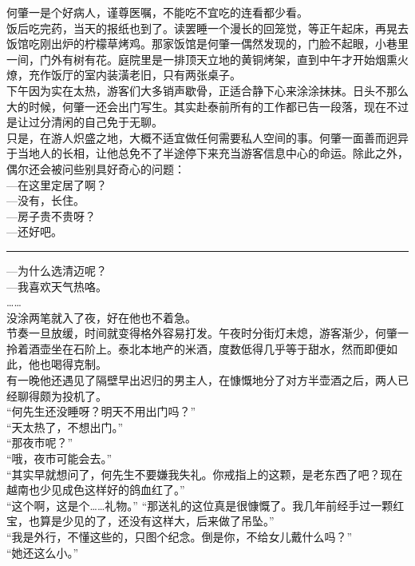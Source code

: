 \documentclass[oneside,11pt]{memoir} %
\begin{document}
\begin{CJK}{UTF8}{gbsn}
    何肇一是个好病人，谨尊医嘱，不能吃不宜吃的连看都少看。\\\indent
    饭后吃完药，当天的报纸也到了。读罢睡一个漫长的回笼觉，等正午起床，再晃去饭馆吃刚出炉的柠檬草烤鸡。那家饭馆是何肇一偶然发现的，门脸不起眼，小巷里一间，门外有树有花。庭院里是一排顶天立地的黄铜烤架，直到中午才开始烟熏火燎，充作饭厅的室内装潢老旧，只有两张桌子。\\\indent
    下午因为实在太热，游客们大多销声歇骨，正适合静下心来涂涂抹抹。日头不那么大的时候，何肇一还会出门写生。其实赴泰前所有的工作都已告一段落，现在不过是让过分清闲的自己免于无聊。\\\indent
    只是，在游人炽盛之地，大概不适宜做任何需要私人空间的事。何肇一面善而迥异于当地人的长相，让他总免不了半途停下来充当游客信息中心的命运。除此之外，偶尔还会被问些别具好奇心的问题：\\\indent
    —在这里定居了啊？\\\indent
    —没有，长住。\\\indent
    —房子贵不贵呀？\\\indent
    —还好吧。\\\indent 
    \rule{-3pt}{30pt} 
    —为什么选清迈呢？\\\indent
    —我喜欢天气热咯。\\\indent
    ……\\\indent
    没涂两笔就入了夜，好在他也不着急。\\\indent
    节奏一旦放缓，时间就变得格外容易打发。午夜时分街灯未熄，游客渐少，何肇一拎着酒壶坐在石阶上。泰北本地产的米酒，度数低得几乎等于甜水，然而即便如此，他也喝得克制。\\\indent
    有一晚他还遇见了隔壁早出迟归的男主人，在慷慨地分了对方半壶酒之后，两人已经聊得颇为投机了。\\\indent
    “何先生还没睡呀？明天不用出门吗？”\\\indent
    “天太热了，不想出门。”\\\indent
    “那夜市呢？”\\\indent
    “哦，夜市可能会去。”\\\indent
    “其实早就想问了，何先生不要嫌我失礼。你戒指上的这颗，是老东西了吧？现在越南也少见成色这样好的鸽血红了。”\\\indent
    “这个啊，这是个……礼物。”
    “那送礼的这位真是很慷慨了。我几年前经手过一颗红宝，也算是少见的了，还没有这样大，后来做了吊坠。”\\\indent
    “我是外行，不懂这些的，只图个纪念。倒是你，不给女儿戴什么吗？”\\\indent
    “她还这么小。”\\\indent

\end{CJK}
\end{document}
